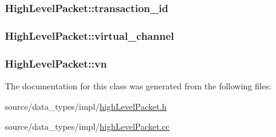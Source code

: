 \hypertarget{classHighLevelPacket_287c21f9e31f882ffe8c8ff353dab087}{
\subsubsection[{transaction\_\-id}]{ {\bf HighLevelPacket::transaction\_\-id}}}
\label{classHighLevelPacket_287c21f9e31f882ffe8c8ff353dab087}


\hypertarget{classHighLevelPacket_0e369f54800e9bb403f8277b94cbaa96}{
\subsubsection[{virtual\_\-channel}]{ {\bf HighLevelPacket::virtual\_\-channel}}}
\label{classHighLevelPacket_0e369f54800e9bb403f8277b94cbaa96}


\hypertarget{classHighLevelPacket_0e554b43c609ab77758300f332679a29}{
\subsubsection[{vn}]{ {\bf HighLevelPacket::vn}}}
\label{classHighLevelPacket_0e554b43c609ab77758300f332679a29}




The documentation for this class was generated from the following files:\begin{CompactItemize}
\item 
source/data\_\-types/impl/\hyperlink{highLevelPacket_8h}{highLevelPacket.h}\item 
source/data\_\-types/impl/\hyperlink{highLevelPacket_8cc}{highLevelPacket.cc}\end{CompactItemize}
